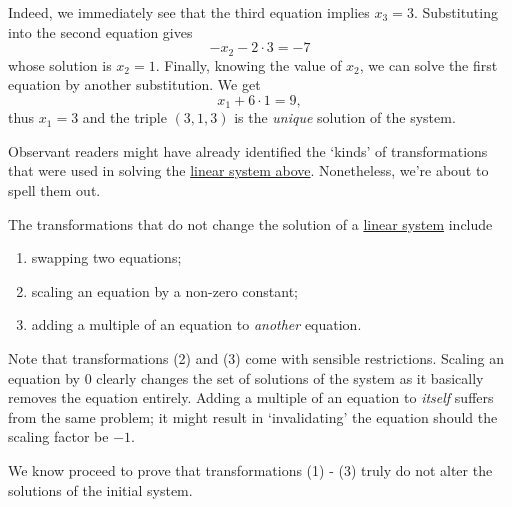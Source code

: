 \begin{probsol}
 Indeed, we immediately see that the third equation implies $x_3 = 3$.
 Substituting into the second equation gives 
 \[
  -x_2 - 2 \cdot 3 = -7
 \]
 whose solution is $x_2 = 1$. Finally, knowing the value of $x_2$, we can solve
 the first equation by another substitution. We get
 \[
  x_1 + 6 \cdot 1 = 9,
 \]
 thus $x_1 = 3$ and the triple $(3,1,3)$ is the \emph{unique} solution of the
 system.
\end{probsol}

Observant readers might have already identified the `kinds' of transformations
that were used in solving the \hyperref[prob:gauss-jordan-elimination]{linear
system above}. Nonetheless, we're about to spell them out.

The transformations that do not change the solution of a
\hyperref[def:linear-system]{linear system} include
\begin{enumerate}
 \item swapping two equations;
 \item scaling an equation by a non-zero constant;
 \item adding a multiple of an equation to \emph{another} equation.
\end{enumerate}
Note that transformations (2) and (3) come with sensible restrictions. Scaling
an equation by $0$ clearly changes the set of solutions of the system as it
basically removes the equation entirely. Adding a multiple of an equation to
\emph{itself} suffers from the same problem; it might result in `invalidating'
the equation should the scaling factor be $-1$.

We know proceed to prove that transformations (1) - (3) truly do not alter the
solutions of the initial system.

